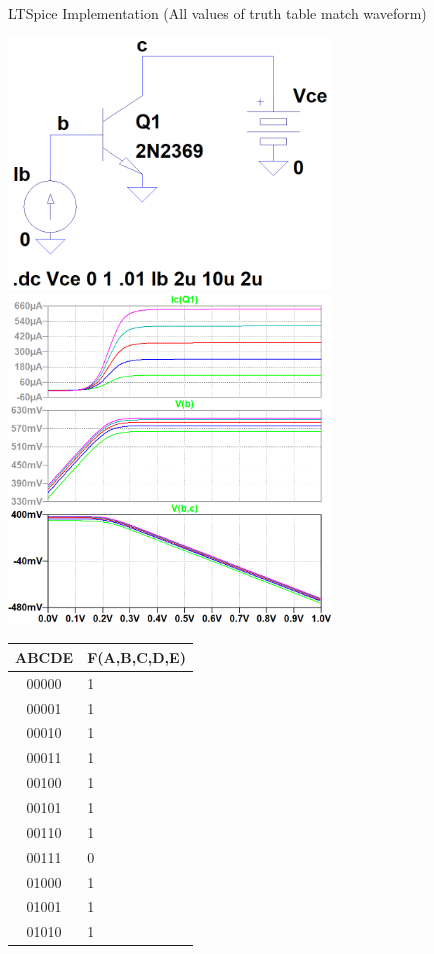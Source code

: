 \documentclass[12pt,letterpaper,titlepage]{article}
\begin{document}
\begin{raggedright}
\begin{center}
LTSpice Implementation (All values of truth table match waveform)
\begin{paracol}{2}
\includegraphics[width=0.64\textwidth, height=\textheight, keepaspectratio=true]{ds1b}
\includegraphics[width=0.64\textwidth, height=\textheight, keepaspectratio=true]{ds1c}
\switchcolumn
\begin{tabular}{| c | l |}
  \hline ABCDE & F(A,B,C,D,E)
\\\hline 00000 & 1
\\\hline 00001 & 1
\\\hline 00010 & 1
\\\hline 00011 & 1
\\\hline 00100 & 1
\\\hline 00101 & 1
\\\hline 00110 & 1
\\\hline 00111 & 0
\\\hline 01000 & 1
\\\hline 01001 & 1
\\\hline 01010 & 1

\end{tabular}
\end{paracol}
\end{center}
\end{raggedright}
\end{document}
